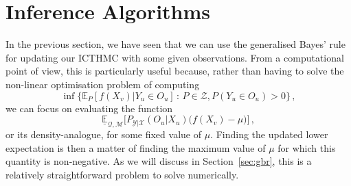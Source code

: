 \documentclass[twoside,11pt]{article}
\newcommand{\reals}{\mathbb{R}}
\newcommand{\states}{\mathcal{X}}
\newcommand{\observs}{\mathcal{Y}}
\newcommand{\lexp}{\underline{\mathbb{E}}_{\rateset,\mathcal{M}}}
\newcommand{\gambles}{\mathcal{L}}
\newcommand{\rateset}{\mathcal{Q}}
\begin{document}

%

\section{Inference Algorithms}\label{sec:inference_algos}

In the previous section, we have seen that we can use the generalised Bayes' rule for updating our ICTHMC with some given observations. From a computational point of view, this is particularly useful because, rather than having to solve the non-linear optimisation problem of computing
\begin{equation*}
\inf\bigl\{\mathbb{E}_P[f(X_v)\vert Y_u\in O_u]\,:\, P\in\mathcal{Z},P(Y_u\in O_u)>0\bigr\}\,,
\end{equation*}
we can focus on evaluating the function
\begin{equation*}
\lexp\bigl[P_{\observs\vert\states}(O_u\vert X_u)\bigl(f(X_v) - \mu\bigr)\bigr]\,,
\end{equation*}
or its density-analogue, for some fixed value of $\mu$. Finding the updated lower expectation is then a matter of finding the maximum value of $\mu$ for which this quantity is non-negative. As we will discuss in Section~\ref{sec:gbr}, this is a relatively straightforward problem to solve numerically.
\end{document}
